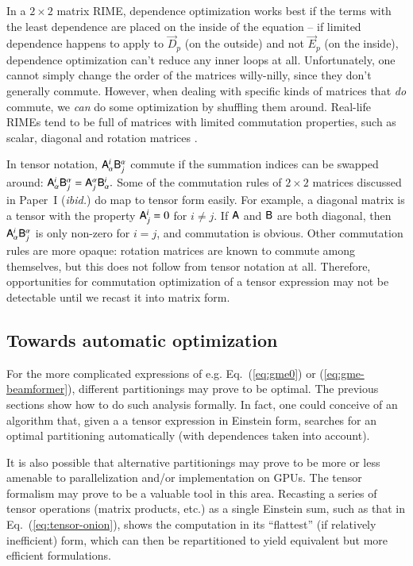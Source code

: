 \documentclass[]{aa}
\newcommand{\jones}[2]{\vec {#1}_{#2}}
\begin{document}
In a $2\times2$ matrix RIME, dependence optimization works best if the terms with the least dependence are placed on the inside of the equation -- if limited dependence happens to apply to $\jones{D}{p}$ (on the outside) and not $\jones{E}{p}$ (on the inside), dependence optimization can't reduce any inner loops at all. Unfortunately, one cannot simply change the order of the matrices willy-nilly, since they don't generally commute. However, when dealing with specific kinds of matrices that \emph{do\/} commute, we \emph{can} do some optimization by shuffling them around. Real-life RIMEs tend to be full of matrices with limited commutation properties, such as scalar, diagonal and rotation matrices \cite[see Paper~I,][Sect.~1.6]{RRIME1}.

In tensor notation, $\mathsf{A}^i_\alpha \mathsf{B}^\alpha_j$ commute if the summation indices can be swapped around: $\mathsf{A}^i_\alpha \mathsf{B}^\alpha_j=\mathsf{A}^\alpha_j \mathsf{B}^i_\alpha.$  Some of the commutation rules of $2\times2$ matrices discussed in Paper~I (\emph{ibid.}) do map to tensor form easily. For example, a diagonal matrix is a tensor with the property $\mathsf{A}^i_j=0$ for $i\ne j$. If $\mathsf{A}$ and $\mathsf{B}$ are both diagonal, then $\mathsf{A}^i_\alpha \mathsf{B}^\alpha_j$ is only non-zero for $i=j$, and commutation is obvious. Other commutation rules are more opaque: rotation matrices are known to commute among themselves, but this does not follow from tensor notation at all.
Therefore, opportunities for commutation optimization of a tensor expression may not be detectable until we recast it into matrix form. 

\subsection{Towards automatic optimization}

For the more complicated expressions of e.g. Eq.~(\ref{eq:gme0}) or (\ref{eq:gme-beamformer}), different partitionings may prove to be optimal. The previous sections show how to do such analysis formally. In fact, one could conceive of an algorithm that, given a a tensor expression in Einstein form, searches for an optimal partitioning automatically (with dependences taken into account).

It is also possible that alternative partitionings may prove to be more or less amenable to parallelization and/or implementation on GPUs. The tensor formalism may prove to be a valuable tool in this area. Recasting a series of tensor operations (matrix products, etc.) as a single Einstein sum, such as that in Eq.~(\ref{eq:tensor-onion}), shows the computation in its ``flattest'' (if relatively inefficient) form, which can then be repartitioned to yield equivalent but more efficient formulations.
\end{document}
